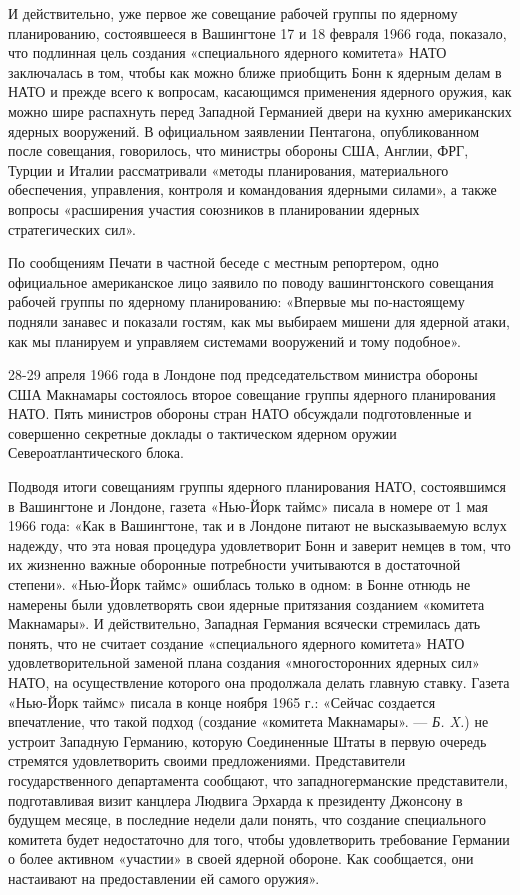 \documentclass[12pt, a4paper, openany]{book}
\begin{document}
	И действительно, уже первое же совещание рабочей группы по ядерному планированию, состоявшееся в Вашингтоне 17 и 18 февраля 1966 года, показало, что подлинная цель создания «специального ядерного комитета» НАТО заключалась в том, чтобы как можно ближе приобщить Бонн к ядерным делам в НАТО и прежде всего к вопросам, касающимся применения ядерного оружия, как можно шире распахнуть перед Западной Германией двери на кухню американских ядерных вооружений. В официальном заявлении Пентагона, опубликованном после совещания, говорилось, что министры обороны США, Англии, ФРГ, Турции и Италии рассматривали «методы планирования, материального обеспечения, управления, контроля и командования ядерными силами», а также вопросы «расширения участия союзников в планировании ядерных стратегических сил».
	
	По сообщениям Печати в частной беседе с местным репортером, одно официальное американское лицо заявило по поводу вашингтонского совещания рабочей группы по ядерному планированию: «Впервые мы по-настоящему подняли занавес и показали гостям, как мы выбираем мишени для ядерной атаки, как мы планируем и управляем системами вооружений и тому подобное».
	
	
	28-29 апреля 1966 года в Лондоне под председательством министра обороны США Макнамары состоялось второе совещание группы ядерного планирования НАТО. Пять министров обороны стран НАТО обсуждали подготовленные и совершенно секретные доклады о тактическом ядерном оружии Североатлантического блока.
	
	Подводя итоги совещаниям группы ядерного планирования НАТО, состоявшимся в Вашингтоне и Лондоне, газета «Нью-Йорк таймс» писала в номере от 1 мая 1966 года: «Как в Вашингтоне, так и в Лондоне питают не высказываемую вслух надежду, что эта новая процедура удовлетворит Бонн и заверит немцев в том, что их жизненно важные оборонные потребности учитываются в достаточной степени». «Нью-Йорк таймс» ошиблась только в одном: в Бонне отнюдь не намерены были удовлетворять свои ядерные притязания созданием «комитета Макнамары». И действительно, Западная Германия всячески стремилась дать понять, что не считает создание «специального ядерного комитета» НАТО удовлетворительной заменой плана создания «многосторонних ядерных сил» НАТО, на осуществление которого она продолжала делать главную ставку. Газета «Нью-Йорк таймс» писала в конце ноября 1965 г.: «Сейчас создается впечатление, что такой подход (создание «комитета Макнамары». — \textit{Б. X.}) не устроит Западную Германию, которую Соединенные Штаты в первую очередь стремятся удовлетворить своими предложениями. Представители государственного департамента сообщают, что западногерманские представители, подготавливая визит канцлера Людвига Эрхарда к президенту Джонсону в будущем месяце, в последние недели дали понять, что создание специального комитета будет недостаточно для того, чтобы удовлетворить требование Германии о более активном «участии» в своей ядерной обороне. Как сообщается, они настаивают на предоставлении ей самого оружия».
	
\end{document}
